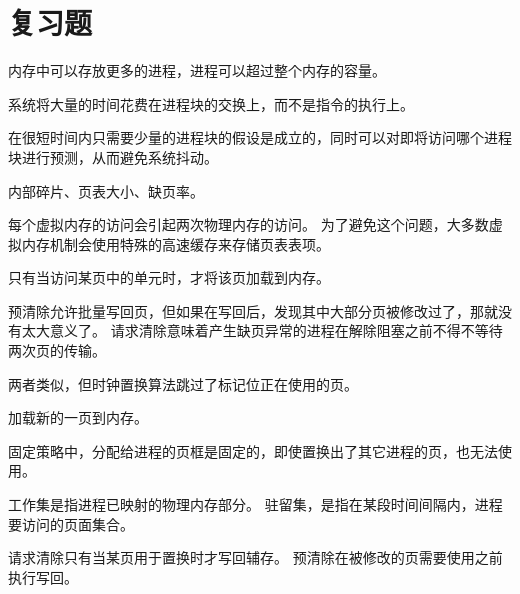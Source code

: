 
\section{复习题}
{
    \begin{reviewc}
        内存中可以存放更多的进程，进程可以超过整个内存的容量。
    \end{reviewc}

    \begin{reviewc}
        系统将大量的时间花费在进程块的交换上，而不是指令的执行上。
    \end{reviewc}

    \begin{reviewc}
        在很短时间内只需要少量的进程块的假设是成立的，同时可以对即将访问哪个进程块进行预测，从而避免系统抖动。
    \end{reviewc}

    \begin{reviewc}
        内部碎片、页表大小、缺页率。
    \end{reviewc}

    \begin{reviewc}
        每个虚拟内存的访问会引起两次物理内存的访问。
        为了避免这个问题，大多数虚拟内存机制会使用特殊的高速缓存来存储页表表项。
    \end{reviewc}

    \begin{reviewc}
        只有当访问某页中的单元时，才将该页加载到内存。
    \end{reviewc}

    \begin{reviewc}
        预清除允许批量写回页，但如果在写回后，发现其中大部分页被修改过了，那就没有太大意义了。
        请求清除意味着产生缺页异常的进程在解除阻塞之前不得不等待两次页的传输。
    \end{reviewc}

    \begin{reviewc}
        两者类似，但时钟置换算法跳过了标记位正在使用的页。
    \end{reviewc}

    \begin{reviewc}
        加载新的一页到内存。
    \end{reviewc}

    \begin{reviewc}
        固定策略中，分配给进程的页框是固定的，即使置换出了其它进程的页，也无法使用。
    \end{reviewc}

    \begin{reviewc}
        工作集是指进程已映射的物理内存部分。
        驻留集，是指在某段时间间隔内，进程要访问的页面集合。
    \end{reviewc}

    \begin{reviewc}
        请求清除只有当某页用于置换时才写回辅存。
        预清除在被修改的页需要使用之前执行写回。
    \end{reviewc}
}
